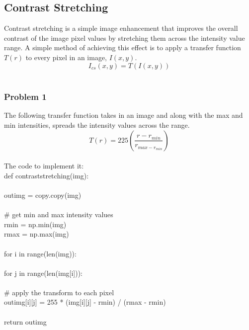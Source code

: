 \documentclass{article}
\begin{document}
	\subsection{Contrast Stretching}
	
	Contrast stretching is a simple image enhancement that improves the overall contrast of the image pixel values by stretching them across the intensity value range. A simple method of achieving this effect is to apply a transfer function $ T(r) $ to every pixel in an image, $ I(x,y) $. \\
	
	\begin{equation}
	I_{cs}(x,y) = T(I(x,y))
	\end{equation} \\
	
	\subsubsection{Problem 1}
	
	The following transfer function takes in an image and along with the max and min intensities, spreads the intensity values across the range. \\
	
	\begin{equation}
	T(r) = 225( \frac{r - r_{min}}{r_{max - r_{min}}} )
	\end{equation} \\
	
	The code to implement it: \\
	
	\noindent def contrast\textunderscore stretching(img):\\
	\\
	\indent out\textunderscore img = copy.copy(img)\\
	\\
	\indent \# get min and max intensity values\\
	\indent r\textunderscore min = np.min(img)\\
	\indent r\textunderscore max = np.max(img)\\
	\\
	\indent for i in range(len(img)):\\
	\\
	\indent \indent for j in range(len(img[i])):\\
	\\
	\indent \indent \indent \# apply the transform to each pixel \\
	\indent \indent \indent out\textunderscore img[i][j] = 255 * (img[i][j] - r\textunderscore min) / (r\textunderscore max - r\textunderscore min)\\
	\\
	\indent return out\textunderscore img\\
	
\end{document}

